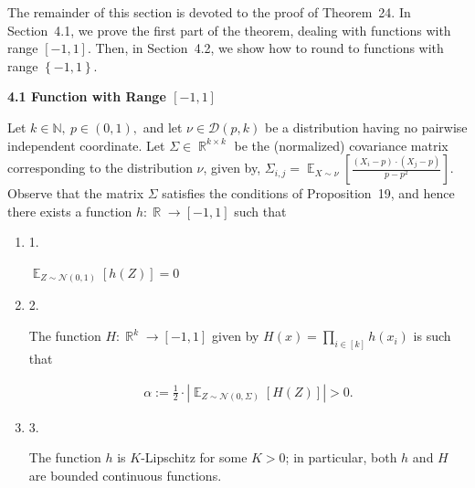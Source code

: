 The remainder of this section is devoted to the proof of Theorem 24.
In Section 4.1, we prove the first part of the theorem, dealing with functions with range $[-1,1]$.
Then, in Section 4.2, we show how to round to functions with range $\left\{-1,1\right\}$.\par




\par\medskip\noindent\textbf{
4.1 Function with Range $[-1,1]$
}\par




Let $k\in\mathbb{N},\ p\in(0,1),$ and let $\nu\in\mathcal{D}(p,k)$ be a distribution having no pairwise independent coordinate.
Let $\Sigma\in\mathop{\mathbb{R}}^{k\times k}$ be the (normalized) covariance matrix corresponding to the distribution $\nu$, given by, $\Sigma_{i,j}=\mathop{\mathbb{E}}_{X\sim\nu}\left[\frac{\left(X_{i}-p\right)\cdot\left(X_{j}-p\right)}{p-p^{2}}\right]$.
Observe that the matrix $\Sigma$ satisfies the conditions of Proposition 19, and hence there exists a function $h:\mathop{\mathbb{R}}\to[-1,1]$ such that\par


\begin{enumerate}


\item[] 
1. 


$\mathop{\mathbb{E}}_{Z\sim\mathcal{N}(0,1)}\left[h(Z)\right]=0$\par





\item[] 
2. 


The function $H:\mathop{\mathbb{R}}^{k}\to[-1,1]$ given by $H(x)=\prod_{i\in[k]}h\left(x_{i}\right)$ is such that\par


\[\begin{gathered}
\alpha:=\frac{1}{2}\cdot\left|\mathop{\mathbb{E}}_{Z\sim\mathcal{N}(0,\Sigma)}\left[H(Z)\right]\right|>0.
\end{gathered}\]





\item[] 
3. 


The function $h$ is $K$-Lipschitz for some $K>0$; in particular, both $h$ and $H$ are bounded continuous functions.\par





\end{enumerate}




